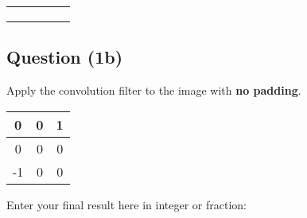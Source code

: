 \documentclass[12pt]{article}
\begin{document}
\begin{center}
\begin{tabular}{|l|l|l|l|l|}
\hline
\hspace{1mm} & \hspace{1mm} & \hspace{1mm} & \hspace{1mm} & \hspace{1mm} \\ \hline
\hspace{1mm} & \hspace{1mm} & \hspace{1mm} & \hspace{1mm} & \hspace{1mm} \\ \hline
\hspace{1mm} & \hspace{1mm} & \hspace{1mm} & \hspace{1mm} & \hspace{1mm} \\ \hline
\hspace{1mm} & \hspace{1mm} & \hspace{1mm} & \hspace{1mm} & \hspace{1mm} \\ \hline
\end{tabular}
\end{center}

\subsection*{Question (1b)} Apply the convolution filter to the image with \textbf{no padding}.
\begin{center}
\begin{tabular}{|c|c|c|}
\hline
0  & 0 & 1 \\ \hline
0  & 0 & 0 \\ \hline
-1 & 0 & 0 \\ \hline
\end{tabular}
\end{center}

\noindent Enter your final result here in integer or fraction:
\end{document}
